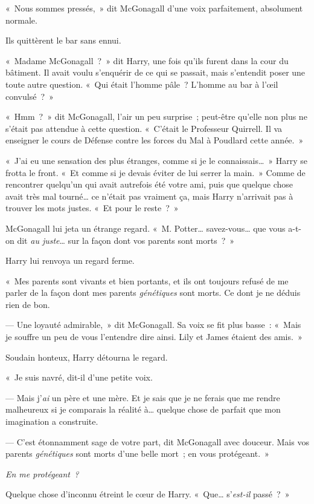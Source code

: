 «~Nous sommes pressés,~» dit McGonagall d'une voix parfaitement, absolument normale.

Ils quittèrent le bar sans ennui.

«~Madame McGonagall~?~» dit Harry, une fois qu'ils furent dans la cour du bâtiment. Il avait voulu s'enquérir de ce qui se passait, mais s'entendit poser une toute autre question. «~Qui était l'homme pâle~? L'homme au bar à l'œil convulsé~?~»

«~Hmm~?~» dit McGonagall, l'air un peu surprise~; peut-être qu'elle non plus ne s'était pas attendue à cette question. «~C'était le Professeur Quirrell. Il va enseigner le cours de Défense contre les forces du Mal à Poudlard cette année.~»

«~J'ai eu une sensation des plus étranges, comme si je le connaissais…~» Harry se frotta le front. «~Et comme si je devais éviter de lui serrer la main.~» Comme de rencontrer quelqu'un qui avait autrefois été votre ami, puis que quelque chose avait très mal tourné… ce n'était pas vraiment ça, mais Harry n'arrivait pas à trouver les mots justes. «~Et pour le reste~?~»

McGonagall lui jeta un étrange regard. «~M. Potter… savez-vous… que vous a-t-on dit \emph{au juste}… sur la façon dont vos parents sont morts~?~»

Harry lui renvoya un regard ferme.

«~Mes parents sont vivants et bien portants, et ils ont toujours refusé de me parler de la façon dont mes parents \emph{génétiques} sont morts. Ce dont je ne déduis rien de bon.

--- Une loyauté admirable,~» dit McGonagall. Sa voix se fit plus basse~: «~Mais je souffre un peu de vous l'entendre dire ainsi. Lily et James étaient des amis.~»

Soudain honteux, Harry détourna le regard.

«~Je suis navré, dit-il d'une petite voix.

--- Mais j'\emph{ai} un père et une mère. Et je sais que je ne ferais que me rendre malheureux si je comparais la réalité à… quelque chose de parfait que mon imagination a construite.

--- C'est étonnamment sage de votre part, dit McGonagall avec douceur. Mais vos parents \emph{génétiques} sont morts d'une belle mort~; en vous protégeant.~»

\emph{En me protégeant~?}

Quelque chose d'inconnu étreint le cœur de Harry. «~Que… s'\emph{est-il} passé~?~»

